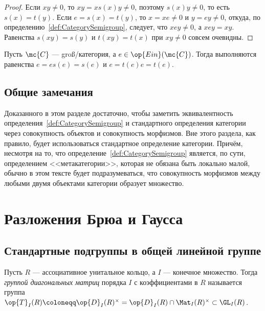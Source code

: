 \documentclass[
	extrafontsizes,
	11pt,
	hyphens,
]{memoir}
\begin{document}
\begin{proof}

Если \(xy \neq 0\), то \(xy = x s(x) y \neq 0\), поэтому \(s(x) y \neq 0\), то есть \(s(x) = t(y)\).
Если \(e = s(x) = t(y)\), то \(x = xe \neq 0\) и \(y = ey \neq 0\), откуда, по определению~\ref{def:CategorySemigroup}, следует, что \(xey \neq 0\), а \(xey = xy\).
Равенства \(s(xy) = s(y)\) и \(t(xy) = t(x)\) при \(xy \neq 0\) совсем очевидны.
\end{proof}

\begin{observation}
Пусть \(\mc{C}\) --- groß\-/категория, а \(e \in \op{Ein}(\mc{C})\). Тогда выполняются равенства \(e = e s(e) = s(e)\) и \(e = t(e) e = t(e)\).
\end{observation}

\subsection{Общие замечания}

Доказанного в этом разделе достаточно, чтобы заметить эквивалентность определения~\ref{def:CategorySemigroup} и стандартного определения категории через совокупность объектов и совокупность морфизмов.
Вне этого раздела, как правило, будет использоваться стандартное определение категории.
Причём, несмотря на то, что определение~\ref{def:CategorySemigroup} является, по сути, определением <<метакатегории>>, которая не обязана быть локально малой, обычно в этом тексте будет подразумеваться, что совокупность морфизмов между любыми двумя объектами категории образует множество.


\section{Разложения Брюа и Гаусса}

\subsection{Стандартные подгруппы в общей линейной группе}

\begin{definition}
Пусть \(R\) --- ассоциативное унитальное кольцо, а \(I\) --- конечное множество.
Тогда \emph{группой диагональных матриц} порядка \(I\) с коэффициентами в \(R\) называется группа \(\op{T}_I(R) \coloneqq \op{D}_I(R)^{\times} = \op{D}_I(R) \cap \Mat_I(R)^{\times} \subset \GL_I(R)\).
\end{definition}
\end{document}

